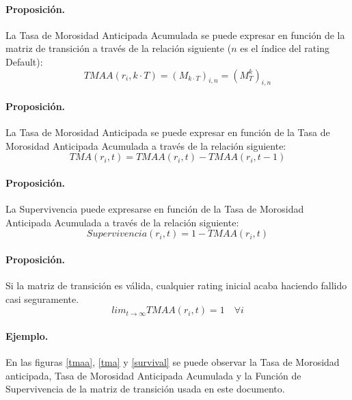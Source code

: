 \paragraph{Proposici\'on.} La Tasa de Morosidad Anticipada Acumulada se 
puede expresar en funci\'on de la matriz de transici\'on a trav\'es de la
relaci\'on siguiente ($n$ es el \'indice del rating Default):
\begin{displaymath}
TMAA(r_i,k \cdot T) = (M_{k \cdot T})_{i,n} = (M_{T}^{k})_{i,n}
\end{displaymath}

\paragraph{Proposici\'on.} La Tasa de Morosidad Anticipada se puede expresar 
en funci\'on de la Tasa de Morosidad Anticipada Acumulada a trav\'es de la
relaci\'on siguiente:
\begin{displaymath}
TMA(r_i, t) =  TMAA(r_i, t) - TMAA(r_i, t-1)
\end{displaymath}

\paragraph{Proposici\'on.} La Supervivencia puede expresarse en funci\'on de
la Tasa de Morosidad Anticipada Acumulada a trav\'es de la relaci\'on siguiente:
\begin{displaymath}
Supervivencia(r_i, t) =  1 - TMAA(r_i, t)
\end{displaymath}

\paragraph{Proposici\'on.} Si la matriz de transici\'on es v\'alida, cualquier 
rating inicial acaba haciendo fallido casi seguramente.
\begin{displaymath}
lim_{t \to \infty} TMAA(r_i, t) =  1 \quad \forall i
\end{displaymath}

\paragraph{Ejemplo.} En las figuras \ref{tmaa}, \ref{tma} y \ref{survival} 
se puede observar la Tasa de Morosidad anticipada, Tasa de Morosidad Anticipada 
Acumulada y la Funci\'on de Supervivencia de la matriz de transici\'on usada en 
este documento.

